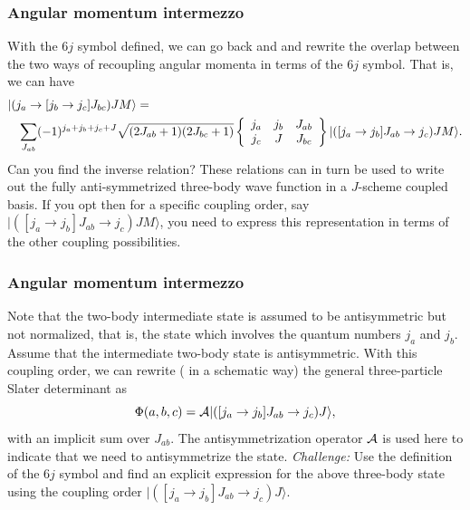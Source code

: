 \documentclass[compress]{beamer}
\begin{document}
\frame
{
\frametitle{Angular momentum intermezzo}
\begin{small}
{\scriptsize
With the $6j$ symbol defined, we can go back and and rewrite the overlap between the two ways of recoupling angular momenta in terms of the $6j$ symbol.
That is, we can have  \begin{eqnarray}
\nonumber
\lefteqn{| (j_a\rightarrow [j_b\rightarrow j_c]J_{bc}) JM\rangle = } \\
\nonumber
& &\sum_{J_{ab}}(-1)^{j_a+j_b+j_c+J}\sqrt{(2J_{ab}+1)(2J_{bc}+1)}\left\{\begin{array}{ccc} j_a & j_b& J_{ab} \\ j_c & J & J_{bc} \end{array}\right\}| ([j_a\rightarrow j_b]J_{ab}\rightarrow j_c) JM\rangle
. \nonumber
\end{eqnarray}
Can you find the inverse relation?  
These relations can in turn be used to write out the fully anti-symmetrized three-body wave function in a $J$-scheme coupled basis. 
If you opt then for a specific coupling order, say $| ([j_a\rightarrow j_b]J_{ab}\rightarrow j_c) JM\rangle$, you need to express this representation in terms of the other coupling possibilities. 
}
\end{small}
}


\frame
{
\frametitle{Angular momentum intermezzo}
\begin{small}
{\scriptsize
Note that the two-body intermediate state is assumed to be antisymmetric but
not normalized, that is, the state which involves the quantum numbers 
$j_a$ and $j_b$. Assume that the intermediate 
two-body state is antisymmetric. With this coupling order, we can 
rewrite ( in a schematic way) the general three-particle Slater determinant as 
\begin{equation}
\Phi(a,b,c) = {\cal A} | ([j_a\rightarrow j_b]J_{ab}\rightarrow j_c) J\rangle, 
\end{equation}
with an implicit sum over $J_{ab}$.  The antisymmetrization operator ${\cal A}$ is used here to indicate that we need to antisymmetrize the state.\newline
{\em Challenge:} Use the definition of the $6j$ symbol and find an explicit 
expression for the above three-body state using the coupling order $| ([j_a\rightarrow j_b]J_{ab}\rightarrow j_c) J\rangle$.
}
\end{small}
}
\end{document}
